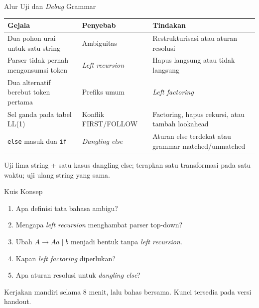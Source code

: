 \documentclass[aspectratio=169,10pt,t]{beamer}
\begin{document}
\begin{frame}{Alur Uji dan \textit{Debug} Grammar}
  \scriptsize
  \setlength{\tabcolsep}{4pt}
  \begin{tabular}{@{}p{4.0cm}p{4.2cm}p{5.2cm}@{}}
    \toprule
    \textbf{Gejala} & \textbf{Penyebab} & \textbf{Tindakan} \\
    \midrule
    Dua pohon urai untuk satu string & Ambiguitas &
      Restrukturisasi atau aturan resolusi \\
    Parser tidak pernah mengonsumsi token & \textit{Left recursion} &
      Hapus langsung atau tidak langsung \\
    Dua alternatif berebut token pertama & Prefiks umum &
      \textit{Left factoring} \\
    Sel ganda pada tabel LL(1) & Konflik FIRST/FOLLOW &
      Factoring, hapus rekursi, atau tambah lookahead \\
    \texttt{else} masuk dua \texttt{if} & \textit{Dangling else} &
      Aturan else terdekat atau grammar matched/unmatched \\
    \bottomrule
  \end{tabular}

  \vspace{4pt}
  {\scriptsize Uji lima string + satu kasus dangling else; terapkan
  satu transformasi pada satu waktu; uji ulang string yang sama.}
\end{frame}

\begin{frame}{Kuis Konsep}
  \small
  \begin{enumerate}
    \setlength{\itemsep}{3pt}
    \item Apa definisi tata bahasa ambigu?
    \item Mengapa \textit{left recursion} menghambat parser top-down?
    \item Ubah \(A \to Aa \mid b\) menjadi bentuk tanpa
          \textit{left recursion}.
    \item Kapan \textit{left factoring} diperlukan?
    \item Apa aturan resolusi untuk \textit{dangling else}?
  \end{enumerate}

  \vspace{4pt}
  {\footnotesize\color{ubbblue!75}Kerjakan mandiri selama 8 menit,
  lalu bahas bersama. Kunci tersedia pada versi handout.}
\end{frame}
\end{document}
